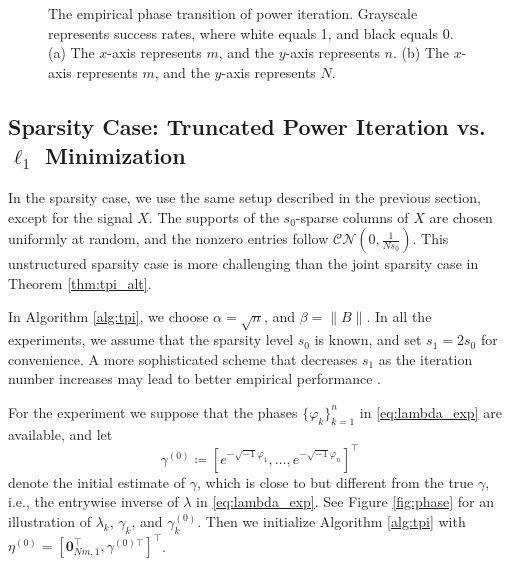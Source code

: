 \documentclass[11pt,journal]{IEEEtran}
\newcommand{\calCN}{\mathcal{CN}}
\newcommand{\norm}[1]{\|{#1}\|}
\newcommand{\T}{\top}
\begin{document}
\begin{figure}[htbp]%
\centering
\subfloat[]{
\label{fig:pi_pt_n}}
\subfloat[]{
\label{fig:pi_pt_N}}
\caption{The empirical phase transition of power iteration. Grayscale represents success rates, where white equals 1, and black equals 0. (a) The $x$-axis represents $m$, and the $y$-axis represents $n$. (b) The $x$-axis represents $m$, and the $y$-axis represents $N$.}%
\label{fig:pi_pt}%
\end{figure}

\subsection{Sparsity Case: Truncated Power Iteration vs. $\ell_1$ Minimization} \label{sec:exp_tpi}
In the sparsity case, we use the same setup described in the previous section, except for the signal $X$. The supports of the $s_0$-sparse columns of $X$ are chosen uniformly at random, and the nonzero entries follow $\calCN(0,\frac{1}{Ns_0})$. This unstructured
sparsity case is more challenging than the joint sparsity case in Theorem \ref{thm:tpi_alt}.

In Algorithm \ref{alg:tpi}, we choose $\alpha = \sqrt{n}$, and $\beta = \norm{B}$. In all the experiments, we assume that the sparsity level $s_0$ is known, and set $s_1 = 2s_0$ for convenience. A more sophisticated scheme that decreases $s_1$ as the iteration number increases may lead to better empirical performance \cite{Yuan2013}. 

For the experiment we suppose that the phases $\{\varphi_k\}_{k=1}^n$ in \eqref{eq:lambda_exp} are available, and let
\begin{equation}
\label{eq:gamma0}
\gamma^{(0)} \coloneqq [e^{-\sqrt{-1}\varphi_1},\dots, e^{-\sqrt{-1}\varphi_n}]^\T
\end{equation}
denote the initial estimate of $\gamma$, which is close to but different from the true $\gamma$, i.e., the entrywise inverse of $\lambda$ in \eqref{eq:lambda_exp}. See Figure \ref{fig:phase} for an illustration of $\lambda_k$, $\gamma_k$, and $\gamma_k^{(0)}$.
Then we initialize Algorithm \ref{alg:tpi} with $\eta^{(0)} = [\bm{0}_{Nm,1}^\T, \gamma^{(0)\T}]^\T$.
\end{document}
